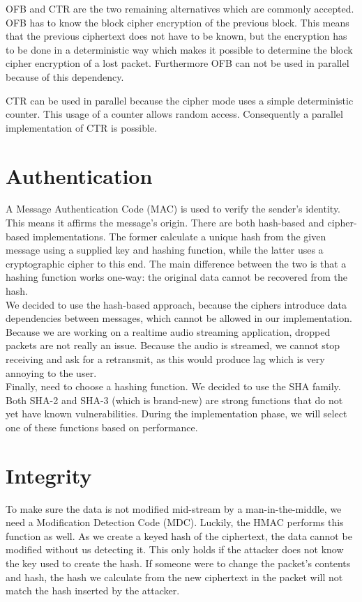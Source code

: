 \documentclass[a4paper]{article}
\begin{document}
OFB and CTR are the two remaining alternatives which are commonly accepted. OFB has to know the block cipher encryption of the previous block. This means that the previous ciphertext does not have to be known, but the encryption has to be done in a deterministic way which makes it possible to determine the block cipher encryption of a lost packet. Furthermore OFB can not be used in parallel because of this dependency.

CTR can be used in parallel because the cipher mode uses a simple deterministic counter. This usage of a counter allows random access. Consequently a parallel implementation of CTR is possible.

\section{Authentication}

A Message Authentication Code (MAC) is used to verify the sender's identity. This means it affirms the message's origin. There are both hash-based and cipher-based implementations. The former calculate a unique hash from the given message using a supplied key and hashing function, while the latter uses a cryptographic cipher to this end. The main difference between the two is that a hashing function works one-way: the original data cannot be recovered from the hash.\\

We decided to use the hash-based approach, because the ciphers introduce data dependencies between messages, which cannot be allowed in our implementation. Because we are working on a realtime audio streaming application, dropped packets are not really an issue. Because the audio is streamed, we cannot stop receiving and ask for a retransmit, as this would produce lag which is very annoying to the user.\\

Finally, need to choose a hashing function. We decided to use the SHA family. Both SHA-2 and SHA-3 (which is brand-new) are strong functions that do not yet have known vulnerabilities. During the implementation phase, we will select one of these functions based on performance.

\section{Integrity}

To make sure the data is not modified mid-stream by a man-in-the-middle, we need a Modification Detection Code (MDC). Luckily, the HMAC performs this function as well. As we create a keyed hash of the ciphertext, the data cannot be modified without us detecting it. This only holds if the attacker does not know the key used to create the hash. If someone were to change the packet's contents and hash, the hash we calculate from the new ciphertext in the packet will not match the hash inserted by the attacker.\\
\end{document}
